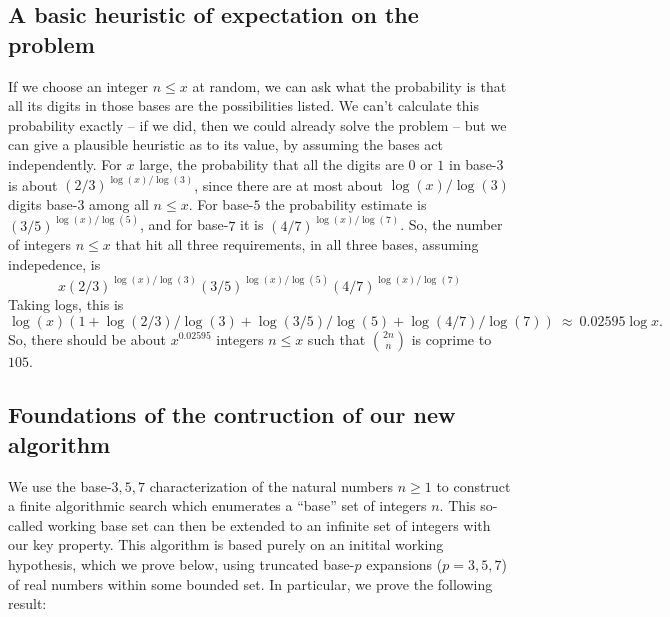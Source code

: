 \documentclass[12pt]{article}
\begin{document}
\subsection{A basic heuristic of expectation on the problem}

If we choose an integer $n \leq x$ at random, we can ask what the 
probability is that all its digits in those bases are the possibilities 
listed.  We can't calculate this probability exactly -- if we did, then we
could already solve the problem -- but we can give a plausible heuristic
as to its value, by assuming the bases act independently.  For $x$ large,
the probability that all the digits are $0$ or $1$ in base-$3$ is 
about $(2/3)^{\log(x)/\log(3)}$, since there are at most 
about $\log(x)/\log(3)$ digits base-$3$ among all $n \leq x$.  For base-$5$
the probability estimate is $(3/5)^{\log(x)/\log(5)}$, and for base-$7$
it is $(4/7)^{\log(x)/\log(7)}$.  So, the number of integers $n \leq x$
that hit all three requirements, in all three bases, assuming indepedence,
is 
$$
x (2/3)^{\log(x)/\log(3)} (3/5)^{\log(x)/\log(5)} (4/7)^{\log(x)/\log(7)}
$$
Taking logs, this is
$$
\log(x) \left ( 1 + \log(2/3)/\log(3) + \log(3/5)/\log(5) + \log(4/7)/\log(7)
\right )\ \approx\ 0.02595 \log x.
$$
So, there should be about $x^{0.02595}$ integers $n \leq x$ such that 
${2n \choose n}$ is coprime to $105$.

\subsection{Foundations of the contruction of our new algorithm} 

We use the base-$3,5,7$ characterization of the natural numbers $n \geq 1$ 
to construct a finite algorithmic search which 
enumerates a ``base'' set of integers $n$. This so-called working base set can then 
be extended to an infinite set of integers with our 
key property. This algorithm is based purely on an initital working hypothesis, which we prove below, 
using truncated base-$p$ expansions ($p = 3,5,7$) of real numbers within some bounded set. 
In particular, we prove the following result: 
\end{document}
